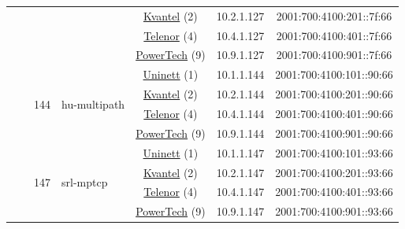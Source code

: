 \begin{small}
\begin{center}
\begin{longtable}{|c|c|c|c|c|c|c|c|}
  &  &  &  & \multicolumn{2}{|c|}{\tiny{\href{http://kvantel.no}{Kvantel} (2)}} & \tiny{10.2.1.127} & \tiny{2001:700:4100:201::7f:66} \\* \cline{5-5}\cline{6-6}\cline{7-7}\cline{8-8}
  &  &  &  & \multicolumn{2}{|c|}{\tiny{\href{https://www.telenor.no}{Telenor} (4)}} & \tiny{10.4.1.127} & \tiny{2001:700:4100:401::7f:66} \\* \cline{5-5}\cline{6-6}\cline{7-7}\cline{8-8}
  &  &  &  & \multicolumn{2}{|c|}{\tiny{\href{http://www.powertech.no}{PowerTech} (9)}} & \tiny{10.9.1.127} & \tiny{2001:700:4100:901::7f:66} \\* \cline{3-3}\cline{4-4}\cline{5-5}\cline{6-6}\cline{7-7}\cline{8-8}
  &  & \multirow{4}{*}{\tiny{144}} & \multicolumn{1}{|l|}{\multirow{4}{*}{\tiny{hu-multipath}}} & \multicolumn{2}{|c|}{\tiny{\href{https://www.uninett.no}{Uninett} (1)}} & \tiny{10.1.1.144} & \tiny{2001:700:4100:101::90:66} \\* \cline{5-5}\cline{6-6}\cline{7-7}\cline{8-8}
  &  &  &  & \multicolumn{2}{|c|}{\tiny{\href{http://kvantel.no}{Kvantel} (2)}} & \tiny{10.2.1.144} & \tiny{2001:700:4100:201::90:66} \\* \cline{5-5}\cline{6-6}\cline{7-7}\cline{8-8}
  &  &  &  & \multicolumn{2}{|c|}{\tiny{\href{https://www.telenor.no}{Telenor} (4)}} & \tiny{10.4.1.144} & \tiny{2001:700:4100:401::90:66} \\* \cline{5-5}\cline{6-6}\cline{7-7}\cline{8-8}
  &  &  &  & \multicolumn{2}{|c|}{\tiny{\href{http://www.powertech.no}{PowerTech} (9)}} & \tiny{10.9.1.144} & \tiny{2001:700:4100:901::90:66} \\* \cline{3-3}\cline{4-4}\cline{5-5}\cline{6-6}\cline{7-7}\cline{8-8}
  &  & \multirow{4}{*}{\tiny{147}} & \multicolumn{1}{|l|}{\multirow{4}{*}{\tiny{srl-mptcp}}} & \multicolumn{2}{|c|}{\tiny{\href{https://www.uninett.no}{Uninett} (1)}} & \tiny{10.1.1.147} & \tiny{2001:700:4100:101::93:66} \\* \cline{5-5}\cline{6-6}\cline{7-7}\cline{8-8}
  &  &  &  & \multicolumn{2}{|c|}{\tiny{\href{http://kvantel.no}{Kvantel} (2)}} & \tiny{10.2.1.147} & \tiny{2001:700:4100:201::93:66} \\* \cline{5-5}\cline{6-6}\cline{7-7}\cline{8-8}
  &  &  &  & \multicolumn{2}{|c|}{\tiny{\href{https://www.telenor.no}{Telenor} (4)}} & \tiny{10.4.1.147} & \tiny{2001:700:4100:401::93:66} \\* \cline{5-5}\cline{6-6}\cline{7-7}\cline{8-8}
  &  &  &  & \multicolumn{2}{|c|}{\tiny{\href{http://www.powertech.no}{PowerTech} (9)}} & \tiny{10.9.1.147} & \tiny{2001:700:4100:901::93:66} \\* \cline{3-3}\cline{4-4}\cline{5-5}\cline{6-6}\cline{7-7}\cline{8-8}

\end{longtable}
\end{center}
\end{small}
